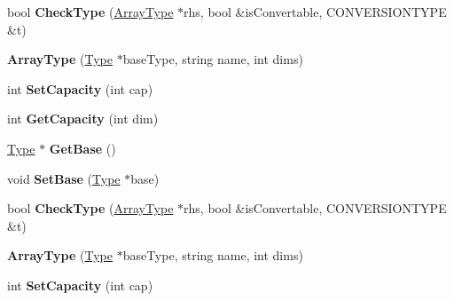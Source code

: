 \begin{DoxyCompactItemize}
\item 
\hypertarget{classArrayType_ad20dee813ec90843a6333e5823e0128a}{bool {\bfseries Check\-Type} (\hyperlink{classArrayType}{Array\-Type} $\ast$rhs, bool \&is\-Convertable, C\-O\-N\-V\-E\-R\-S\-I\-O\-N\-T\-Y\-P\-E \&t)}\label{classArrayType_ad20dee813ec90843a6333e5823e0128a}

\item 
\hypertarget{classArrayType_a90aea374946e0e5cf4b89fc039969f82}{{\bfseries Array\-Type} (\hyperlink{classType}{Type} $\ast$base\-Type, string name, int dims)}\label{classArrayType_a90aea374946e0e5cf4b89fc039969f82}

\item 
\hypertarget{classArrayType_acff47fdbadc911bcb3236dcb9e8dd0a4}{int {\bfseries Set\-Capacity} (int cap)}\label{classArrayType_acff47fdbadc911bcb3236dcb9e8dd0a4}

\item 
\hypertarget{classArrayType_a97ce54630d5df790a8a706cb2f1c5751}{int {\bfseries Get\-Capacity} (int dim)}\label{classArrayType_a97ce54630d5df790a8a706cb2f1c5751}

\item 
\hypertarget{classArrayType_ac874b4e13dba44082d7eec7e057fd74c}{\hyperlink{classType}{Type} $\ast$ {\bfseries Get\-Base} ()}\label{classArrayType_ac874b4e13dba44082d7eec7e057fd74c}

\item 
\hypertarget{classArrayType_ae198281d73c175b70c41856ee9bcfbb9}{void {\bfseries Set\-Base} (\hyperlink{classType}{Type} $\ast$base)}\label{classArrayType_ae198281d73c175b70c41856ee9bcfbb9}

\item 
\hypertarget{classArrayType_ad20dee813ec90843a6333e5823e0128a}{bool {\bfseries Check\-Type} (\hyperlink{classArrayType}{Array\-Type} $\ast$rhs, bool \&is\-Convertable, C\-O\-N\-V\-E\-R\-S\-I\-O\-N\-T\-Y\-P\-E \&t)}\label{classArrayType_ad20dee813ec90843a6333e5823e0128a}

\item 
\hypertarget{classArrayType_a90aea374946e0e5cf4b89fc039969f82}{{\bfseries Array\-Type} (\hyperlink{classType}{Type} $\ast$base\-Type, string name, int dims)}\label{classArrayType_a90aea374946e0e5cf4b89fc039969f82}

\item 
\hypertarget{classArrayType_acff47fdbadc911bcb3236dcb9e8dd0a4}{int {\bfseries Set\-Capacity} (int cap)}\label{classArrayType_acff47fdbadc911bcb3236dcb9e8dd0a4}


\end{DoxyCompactItemize}
